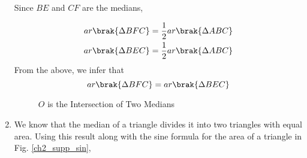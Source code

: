 \begin{enumerate}[label=\arabic*.,ref=\thesubsection.\theenumi]
\solution Since $BE$ and $CF$ are the medians, 

\begin{align}
ar \brak{\Delta BFC} &= \frac{1}{2} ar \brak{\Delta ABC} \\
ar \brak{\Delta BEC} &= \frac{1}{2} ar \brak{\Delta ABC} 
\end{align}
From the above, we infer that
%
\begin{equation}
ar \brak{\Delta BFC} = ar \brak{\Delta BEC}
\end{equation}


\begin{figure}[!ht]
	\begin{center}
		
		\resizebox{\columnwidth}{!}{}
	\end{center}
	\caption{$O$ is the Intersection of Two Medians}
	\label{ch2_median_ratio}	
\end{figure}
%
%
%
%
\item
	We know that the median of a triangle  divides it into two triangles with equal area. Using this result along with the sine formula for the area of a triangle in Fig. \ref{ch2_supp_sin},
\begin{figure}[!ht]
	\begin{center}
		

\end{center}
\end{figure}
\end{enumerate}
